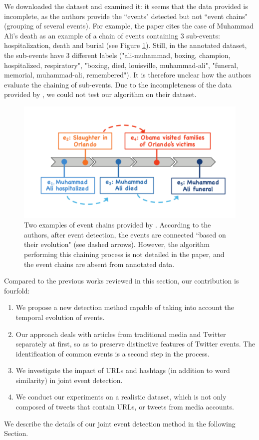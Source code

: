 We downloaded the dataset and examined it: it seems that the data provided is incomplete, as the authors provide the 
``events" detected but not 
``event chains" (grouping of several events). For example, the paper \citep{mele2019event}  cites the case of Muhammad Ali's death as an example of a chain of events containing 3 sub-events: hospitalization, death and burial (see Figure \ref{fig:mele-muhammad}). Still, in the annotated dataset, the sub-events have 3 different labels ("ali-muhammad, boxing, champion, hospitalized, respiratory", "boxing, died, louisville, muhammad-ali", "funeral, memorial, muhammad-ali, remembered"). It is therefore unclear how the authors evaluate the chaining of sub-events. Due to the incompleteness of the data provided by \citet{mele2019event}, we could not test our algorithm on their dataset.
\begin{figure}
    \centering
    \includegraphics[width=.6\textwidth]{figures/Mele_Muhammad_Ali.png}
    \caption[Two examples of event chains provided by \cite{mele2019event}]{Two examples of event chains provided by \cite{mele2019event}. According to the authors, after event detection, the events are connected ``based on their evolution" (see dashed arrows). However, the algorithm performing this chaining process is not detailed in the paper, and the event chains are absent from annotated data.}
    \label{fig:mele-muhammad}
\end{figure}

Compared to the previous works reviewed in this section, our contribution is fourfold:
\begin{enumerate}
    \item We propose a new detection method capable of taking into account the temporal evolution of events.
    \item Our approach deals with articles from traditional media and Twitter separately at first, so as to preserve distinctive features of Twitter events. The identification of common events is a second step in the process.
    \item We investigate the impact of URLs and hashtags (in addition to word similarity) in joint event detection.
    \item We conduct our experiments on a realistic dataset, which is not only composed of tweets that contain URLs, or tweets from media accounts.
\end{enumerate}
We describe the details of our joint event detection method in the following Section.
